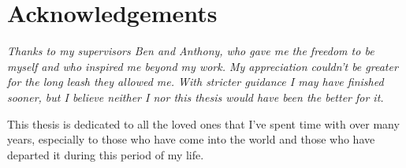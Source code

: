 
\section*{Acknowledgements}

\itshape
Thanks to my supervisors Ben and Anthony, who gave me the freedom to be myself and who inspired me beyond my work.
My appreciation couldn't be greater for the long leash they allowed me.
With stricter guidance I may have finished sooner, but I believe neither I nor this thesis would have been the better for it.

This thesis is dedicated to all the loved ones that I've spent time with over many years, especially to those who have come into the world and those who have departed it during this period of my life.
\upshape
